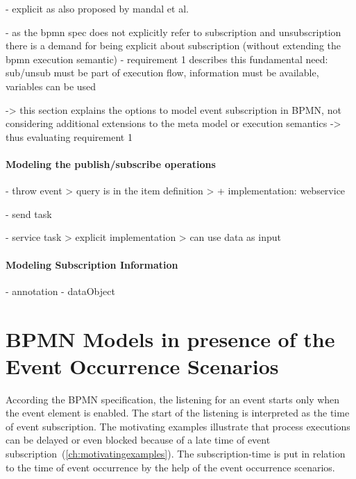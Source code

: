 - explicit as also proposed by mandal et al.

- as the bpmn spec does not explicitly refer to subscription and unsubscription there is a demand for being explicit about subscription (without extending the bpmn execution semantic)
- requirement 1 describes this fundamental need: sub/unsub must be part of execution flow, information must be available, variables can be used

-> this section explains the options to model event subscription in BPMN, not considering additional extensions to the meta model or execution semantics
-> thus evaluating requirement 1

\paragraph{Modeling the publish/subscribe operations}

- throw event
	> query is in the item definition
	> + implementation: webservice

- send task

- service task
	> explicit implementation
	> can use data as input

\paragraph{Modeling Subscription Information}
- annotation
- dataObject


\section{BPMN Models in presence of the Event Occurrence Scenarios}\label{ch:ass:models}
According the BPMN specification, the listening for an event starts only when the event element is enabled. The start of the listening is interpreted as the time of event subscription.
The motivating examples illustrate that process executions can be delayed or even blocked because of a late time of event subscription~(\autoref{ch:motivatingexamples}).
The subscription-time is put in relation to the time of event occurrence by the help of the event occurrence scenarios.


